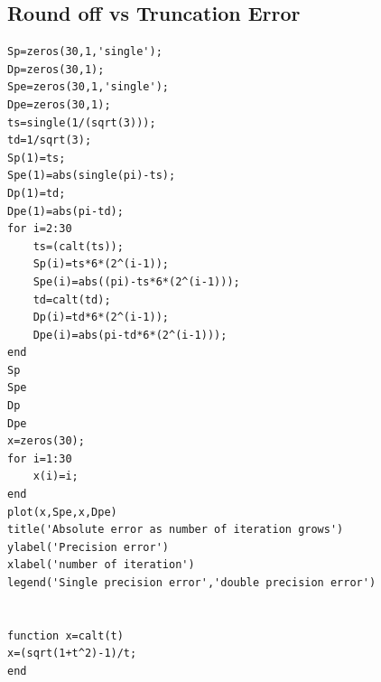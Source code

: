 \documentclass{article}
\begin{document}
\subsection{Round off vs Truncation Error}
\begin{lstlisting}
Sp=zeros(30,1,'single');
Dp=zeros(30,1);
Spe=zeros(30,1,'single');
Dpe=zeros(30,1);
ts=single(1/(sqrt(3)));
td=1/sqrt(3);
Sp(1)=ts;
Spe(1)=abs(single(pi)-ts);
Dp(1)=td;
Dpe(1)=abs(pi-td);
for i=2:30
    ts=(calt(ts));
    Sp(i)=ts*6*(2^(i-1));
    Spe(i)=abs((pi)-ts*6*(2^(i-1)));
    td=calt(td);
    Dp(i)=td*6*(2^(i-1));
    Dpe(i)=abs(pi-td*6*(2^(i-1)));
end
Sp
Spe
Dp
Dpe
x=zeros(30);
for i=1:30
    x(i)=i;
end
plot(x,Spe,x,Dpe)
title('Absolute error as number of iteration grows')
ylabel('Precision error')
xlabel('number of iteration')
legend('Single precision error','double precision error')


function x=calt(t)
x=(sqrt(1+t^2)-1)/t;
end
\end{lstlisting}
\end{document}
